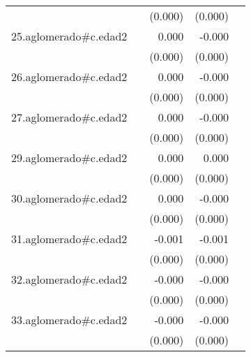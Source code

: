 {\begin{longtable}{l*{4}{D{.}{.}{-1}}}
            &                     &     (0.000)         &     (0.000)         &                     \\
\addlinespace
25.aglomerado#c.edad2&                     &       0.000         &      -0.000         &                     \\
            &                     &     (0.000)         &     (0.000)         &                     \\
\addlinespace
26.aglomerado#c.edad2&                     &       0.000         &      -0.000         &                     \\
            &                     &     (0.000)         &     (0.000)         &                     \\
\addlinespace
27.aglomerado#c.edad2&                     &       0.000         &      -0.000         &                     \\
            &                     &     (0.000)         &     (0.000)         &                     \\
\addlinespace
29.aglomerado#c.edad2&                     &       0.000\sym{**} &       0.000         &                     \\
            &                     &     (0.000)         &     (0.000)         &                     \\
\addlinespace
30.aglomerado#c.edad2&                     &       0.000         &      -0.000         &                     \\
            &                     &     (0.000)         &     (0.000)         &                     \\
\addlinespace
31.aglomerado#c.edad2&                     &      -0.001\sym{***}&      -0.001\sym{***}&                     \\
            &                     &     (0.000)         &     (0.000)         &                     \\
\addlinespace
32.aglomerado#c.edad2&                     &      -0.000         &      -0.000\sym{***}&                     \\
            &                     &     (0.000)         &     (0.000)         &                     \\
\addlinespace
33.aglomerado#c.edad2&                     &      -0.000         &      -0.000\sym{***}&                     \\
            &                     &     (0.000)         &     (0.000)         &                     \\

\end{longtable}}
